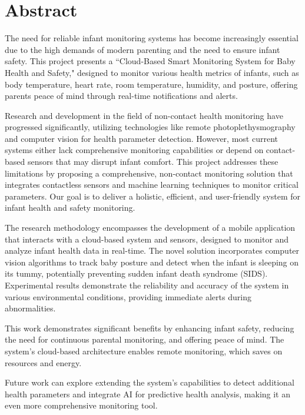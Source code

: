 \documentclass[12pt,a4paper]{report}
\begin{document}
\chapter*{\centering Abstract}
\begin{justify}

    The need for reliable infant monitoring systems has become increasingly essential due to the high demands of modern parenting and the need to ensure infant safety. This project presents a ``Cloud-Based Smart Monitoring System for Baby Health and Safety," designed to monitor various health metrics of infants, such as body temperature, heart rate, room temperature, humidity, and posture, offering parents peace of mind through real-time notifications and alerts.
  
  \noindent Research and development in the field of non-contact health monitoring have progressed significantly, utilizing technologies like remote photoplethysmography and computer vision for health parameter detection. However, most current systems either lack comprehensive monitoring capabilities or depend on contact-based sensors that may disrupt infant comfort. This project addresses these limitations by proposing a comprehensive, non-contact monitoring solution that integrates contactless sensors and machine learning techniques to monitor critical parameters. Our goal is to deliver a holistic, efficient, and user-friendly system for infant health and safety monitoring.
  
  \noindent The research methodology encompasses the development of a mobile application that interacts with a cloud-based system and sensors, designed to monitor and analyze infant health data in real-time. The novel solution incorporates computer vision algorithms to track baby posture and detect when the infant is sleeping on its tummy, potentially preventing sudden infant death syndrome (SIDS). Experimental results demonstrate the reliability and accuracy of the system in various environmental conditions, providing immediate alerts during abnormalities.
  
  \noindent This work demonstrates significant benefits by enhancing infant safety, reducing the need for continuous parental monitoring, and offering peace of mind. The system's cloud-based architecture enables remote monitoring, which saves on resources and energy.
  
  \noindent Future work can explore extending the system’s capabilities to detect additional health parameters and integrate AI for predictive health analysis, making it an even more comprehensive monitoring tool.
\end{justify}
\end{document}
